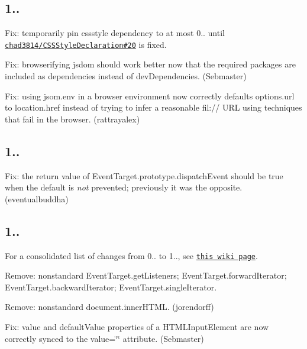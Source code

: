\subsection*{1..}


\begin{DoxyItemize}
\item Fix\+: temporarily pin {\ttfamily cssstyle} dependency to at most 0.. until \href{https://github.com/chad3814/CSSStyleDeclaration/issues/20}{\tt chad3814/\+C\+S\+S\+Style\+Declaration\#20} is fixed.
\item Fix\+: browserifying jsdom should work better now that the required packages are included as {\ttfamily dependencies} instead of {\ttfamily dev\+Dependencies}. (Sebmaster)
\item Fix\+: using {\ttfamily jsom.\+env} in a browser environment now correctly defaults {\ttfamily options.\+url} to {\ttfamily location.\+href} instead of trying to infer a reasonable {\ttfamily fil\+://} U\+RL using techniques that fail in the browser. (rattrayalex)
\end{DoxyItemize}

\subsection*{1..}


\begin{DoxyItemize}
\item Fix\+: the return value of {\ttfamily Event\+Target.\+prototype.\+dispatch\+Event} should be {\ttfamily true} when the default is {\itshape not} prevented; previously it was the opposite. (eventualbuddha)
\end{DoxyItemize}

\subsection*{1..}

For a consolidated list of changes from 0.. to 1.., see \href{https://github.com/tmpvar/jsdom/wiki/Changes-from-0.11.1-to-1.0.0}{\tt this wiki page}.


\begin{DoxyItemize}
\item Remove\+: nonstandard {\ttfamily Event\+Target.\+get\+Listeners}; {\ttfamily Event\+Target.\+forward\+Iterator}; {\ttfamily Event\+Target.\+backward\+Iterator}; {\ttfamily Event\+Target.\+single\+Iterator}.
\item Remove\+: nonstandard {\ttfamily document.\+inner\+H\+T\+ML}. (jorendorff)
\item Fix\+: {\ttfamily value} and {\ttfamily default\+Value} properties of a {\ttfamily H\+T\+M\+L\+Input\+Element} are now correctly synced to the {\ttfamily value=\char`\"{}\char`\"{}} attribute. (Sebmaster)
\end{DoxyItemize}

